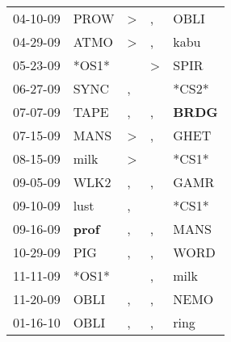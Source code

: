 \begin{supertabular}{p{0.07\textwidth}p{0.06\textwidth}p{0.02\textwidth}p{0.02\textwidth}p{0.06\textwidth}}
          04-10-09\textsuperscript{} &           PROW\textsuperscript{} &     \textgreater &                , &           OBLI\textsuperscript{} \\
          04-29-09\textsuperscript{} &           ATMO\textsuperscript{} &     \textgreater &                , &           kabu\textsuperscript{} \\
          05-23-09\textsuperscript{} &                            *OS1* &                  &     \textgreater &           SPIR\textsuperscript{} \\
          06-27-09\textsuperscript{} &           SYNC\textsuperscript{} &                , &                  &                            *CS2* \\
          07-07-09\textsuperscript{} &           TAPE\textsuperscript{} &                , &                , &  \textbf{BRDG\textsuperscript{}} \\
          07-15-09\textsuperscript{} &           MANS\textsuperscript{} &     \textgreater &                , &           GHET\textsuperscript{} \\
          08-15-09\textsuperscript{} &           milk\textsuperscript{} &     \textgreater &                  &                            *CS1* \\
          09-05-09\textsuperscript{} &           WLK2\textsuperscript{} &                , &                , &           GAMR\textsuperscript{} \\
          09-10-09\textsuperscript{} &           lust\textsuperscript{} &                , &                  &                            *CS1* \\
          09-16-09\textsuperscript{} &  \textbf{prof\textsuperscript{}} &                , &                , &           MANS\textsuperscript{} \\
          10-29-09\textsuperscript{} &            PIG\textsuperscript{} &                , &                , &           WORD\textsuperscript{} \\
          11-11-09\textsuperscript{} &                            *OS1* &                  &                , &           milk\textsuperscript{} \\
          11-20-09\textsuperscript{} &           OBLI\textsuperscript{} &                , &                , &           NEMO\textsuperscript{} \\
          01-16-10\textsuperscript{} &           OBLI\textsuperscript{} &                , &                , &           ring\textsuperscript{} \\

\end{supertabular}
